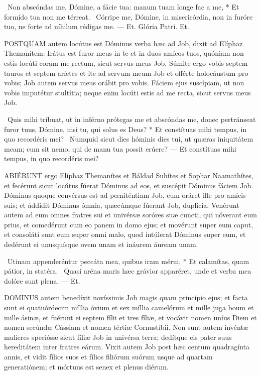 \R\ Non abscóndas me, Dómine, a fácie tua: manum tuam longe fac a me, * Et formído tua non me térreat. \V\ Córripe me, Dómine, in misericórdia, non in furóre tuo, ne forte ad níhilum rédigas me. — Et. Glória Patri. Et.




\lettrine[lines=2]{P}{OSTQUAM} autem locútus est Dóminus verba hæc ad Job, dixit ad Elíphaz Themanítem: Irátus est furor meus in te et in duos amícos tuos, quóniam non estis locúti coram me rectum, sicut servus meus Job. Súmite ergo vobis septem tauros et septem aríetes et ite ad servum meum Job et offérte holocáustum pro vobis; Job autem servus meus orábit pro vobis. Fáciem ejus suscípiam, ut non vobis imputétur stultítia; neque enim locúti estis ad me recta, sicut servus meus Job.

\R\ Quis mihi tríbuat, ut in inférno prótegas me et abscóndas me, donec pertránseat furor tuus, Dómine, nisi tu, qui solus es Deus? * Et constítuas mihi tempus, in quo recordéris mei? \V\ Numquid sicut dies hóminis dies tui, ut quæras iniquitátem meam; cum sit nemo, qui de manu tua possit erúere? — Et constítuas mihi tempus, in quo recordéris mei?


\lettrine[lines=2]{A}{BIÉRUNT} ergo Elíphaz Themanítes et Báldad Suhítes et Sophar Naamathítes, et fecérunt sicut locútus fúerat Dóminus ad eos, et suscépit Dóminus fáciem Job. Dóminus quoque convérsus est ad pœniténtiam Job, cum oráret ille pro amícis suis; et áddidit Dóminus ómnia, quæcúmque fúerant Job, duplícia. Venérunt autem ad eum omnes fratres sui et univérsæ soróres suæ cuncti, qui nóverant eum prius, et comedérunt cum eo panem in domo ejus; et movérunt super eum caput, et consoláti sunt eum super omni malo, quod intúlerat Dóminus super eum, et dedérunt ei unusquísque ovem unam et ináurem áuream unam.

\R\ Utinam appenderéntur peccáta mea, quibus iram mérui, * Et calamítas, quam pátior, in statéra. \V\ Quasi aréna maris hæc grávior apparéret, unde et verba mea dolóre sunt plena. — Et.



\lettrine[lines=2]{D}{OMINUS} autem benedíxit novíssimis Job magis quam princípio ejus; et facta sunt ei quatuórdecim míllia óvium et sex míllia camelórum et mille juga boum et mille ásinæ, et fuérunt ei septem fílii et tres fíliæ, et vocávit nomen uníus Diem et nomen secúndæ Cássiam et nomen tértiæ Cornustíbii. Non sunt autem invéntæ mulíeres speciósæ sicut fíliæ Job in univérsa terra; dedítque eis pater suus hereditátem inter fratres eárum. Vixit autem Job post hæc centum quadragínta annis, et vidit fílios suos et fílios filiórum suórum usque ad quartam generatiónem; et mórtuus est senex et plenus diérum.


